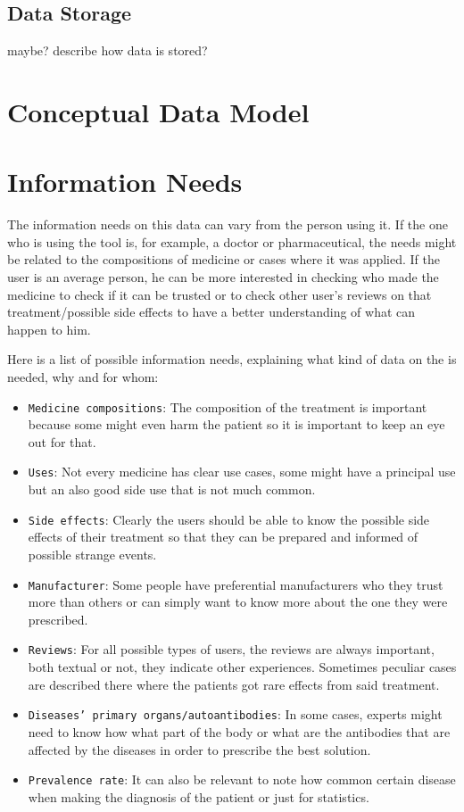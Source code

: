 \documentclass[sigconf]{acmart}
\begin{document}
\subsection{Data Storage}

maybe? describe how data is stored?

\section{Conceptual Data Model}

\section{Information Needs}

The information needs on this data can vary from the person using it. If the one who is using the tool is, for example, a doctor or pharmaceutical, the needs might be related to the compositions of medicine or cases where it was applied. If the user is an average person, he can be more interested in checking who made the medicine to check if it can be trusted or to check other user's reviews on that treatment/possible side effects to have a better understanding of what can happen to him.

Here is a list of possible information needs, explaining what kind of data on the is needed, why and for whom:
\begin{itemize}
	\item {\texttt{Medicine compositions}}: The composition of the treatment is important because some might even harm the patient so it is important to keep an eye out for that.
	\item {\texttt{Uses}}: Not every medicine has clear use cases, some might have a principal use but an also good side use that is not much common.
	\item {\texttt{Side effects}}: Clearly the users should be able to know the possible side effects of their treatment so that they can be prepared and informed of possible strange events.
	\item {\texttt{Manufacturer}}: Some people have preferential manufacturers who they trust more than others or can simply want to know more about the one they were prescribed.
	\item {\texttt{Reviews}}: For all possible types of users, the reviews are always important, both textual or not, they indicate other experiences. Sometimes peculiar cases are described there where the patients got rare effects from said treatment.
	\item {\texttt{Diseases' primary organs/autoantibodies}}: In some cases, experts might need to know how what part of the body or what are the antibodies that are affected by the diseases in order to prescribe the best solution.
	\item {\texttt{Prevalence rate}}: It can also be relevant to note how common certain disease when making the diagnosis of the patient or just for statistics.
\end{itemize}
\end{document}
